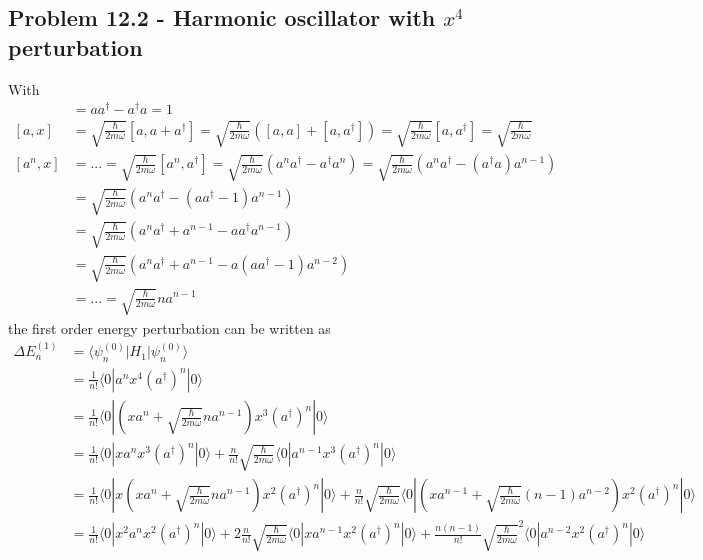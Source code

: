 \documentclass[../main.tex]{subfiles}
\begin{document}
\subsection{Problem 12.2 - Harmonic oscillator with $x^4$ perturbation}
With
\begin{align}
[a,a^\dagger]&=aa^\dagger-a^\dagger a=1\\
[a,x]&=\sqrt{\frac{\hbar}{2m\omega}}[a,a+a^\dagger]=\sqrt{\frac{\hbar}{2m\omega}}\left([a,a]+[a,a^\dagger]\right)=\sqrt{\frac{\hbar}{2m\omega}}[a,a^\dagger]=\sqrt{\frac{\hbar}{2m\omega}}\\
[a^n,x]&=...=\sqrt{\frac{\hbar}{2m\omega}}[a^n,a^\dagger]
=\sqrt{\frac{\hbar}{2m\omega}}(a^na^\dagger-a^\dagger a^n)
=\sqrt{\frac{\hbar}{2m\omega}}(a^na^\dagger-(a^\dagger a) a^{n-1})\\
&=\sqrt{\frac{\hbar}{2m\omega}}(a^na^\dagger-(aa^\dagger-1) a^{n-1})\\
&=\sqrt{\frac{\hbar}{2m\omega}}(a^na^\dagger+a^{n-1}-aa^\dagger a^{n-1})\\
&=\sqrt{\frac{\hbar}{2m\omega}}(a^na^\dagger+a^{n-1}-a(aa^\dagger-1) a^{n-2})\\
&=...=\sqrt{\frac{\hbar}{2m\omega}}na^{n-1}
\end{align}
the first order energy perturbation can be written as
\begin{align}
\Delta E^{(1)}_n
&=\langle\psi^{(0)}_n|H_1|\psi^{(0)}_n\rangle\\
&=\frac{1}{n!}\langle0|a^nx^4(a^\dagger)^n|0\rangle\\
&=\frac{1}{n!}\langle0|\left(xa^n+\sqrt{\frac{\hbar}{2m\omega}}na^{n-1}\right)x^3(a^\dagger)^n|0\rangle\\
&=\frac{1}{n!}\langle0|xa^nx^3(a^\dagger)^n|0\rangle+\frac{n}{n!}\sqrt{\frac{\hbar}{2m\omega}}\langle0|a^{n-1}x^3(a^\dagger)^n|0\rangle\\
&=\frac{1}{n!}\langle0|x\left(xa^n+\sqrt{\frac{\hbar}{2m\omega}}na^{n-1}\right)x^2(a^\dagger)^n|0\rangle+\frac{n}{n!}\sqrt{\frac{\hbar}{2m\omega}}\langle0|\left(xa^{n-1}+\sqrt{\frac{\hbar}{2m\omega}}(n-1)a^{n-2}\right)x^2(a^\dagger)^n|0\rangle\\
&=\frac{1}{n!}\langle0|x^2a^nx^2(a^\dagger)^n|0\rangle+
2\frac{n}{n!}\sqrt{\frac{\hbar}{2m\omega}}\langle0|xa^{n-1}x^2(a^\dagger)^n|0\rangle+\frac{n(n-1)}{n!}\sqrt{\frac{\hbar}{2m\omega}}^2\langle0|a^{n-2}x^2(a^\dagger)^n|0\rangle\\
\end{align}
\end{document}
